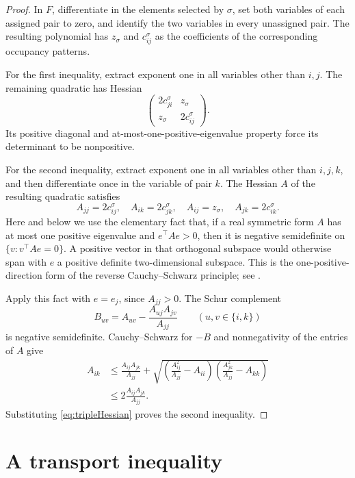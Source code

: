 \documentclass[11pt]{article}
\theoremstyle{definition}
\begin{document}
\begin{proof}
In $F$, differentiate in the elements selected by $\sigma$, set both variables
of each assigned pair to zero, and identify the two variables in every
unassigned pair.  The resulting polynomial has $z_{\sigma}$ and $c^{\sigma}_{ij}$ as
the coefficients of the corresponding occupancy patterns.

For the first inequality, extract exponent one in all variables other
than $i,j$.  The remaining quadratic has Hessian
\[
 \begin{pmatrix}2c^{\sigma}_{ji}&z_{\sigma}\\z_{\sigma}&2c^{\sigma}_{ij}\end{pmatrix}.
\]
Its positive diagonal and at-most-one-positive-eigenvalue property force
its determinant to be nonpositive.

For the second inequality, extract exponent one in all variables other
than $i,j,k$, and then differentiate once in the variable of pair $k$.
The Hessian $A$ of the resulting quadratic satisfies
\begin{equation}\label{eq:tripleHessian}
 A_{jj}=2c^{\sigma}_{ij},\quad A_{ik}=2c^{\sigma}_{jk},\quad
 A_{ij}=z_{\sigma},\quad A_{jk}=2c^{\sigma}_{ik}.
\end{equation}
Here and below we use the elementary fact that, if a real symmetric form
$A$ has at most one positive eigenvalue and $e^\top Ae>0$, then it is
negative semidefinite on $\{v:v^\top Ae=0\}$.  A positive vector in that
orthogonal subspace would otherwise span with $e$ a positive definite
two-dimensional subspace.
This is the one-positive-direction form of the reverse
Cauchy--Schwarz principle; see \cite[Lemma~3]{BrandenHuh2018}.

Apply this fact with $e=e_j$, since $A_{jj}>0$.  The Schur complement
\[
 B_{uv}=A_{uv}-\frac{A_{uj}A_{jv}}{A_{jj}}
 \qquad(u,v\in\{i,k\})
\]
is negative semidefinite.  Cauchy--Schwarz for $-B$ and nonnegativity of
the entries of $A$ give
\begin{align*}
 A_{ik}
 &\le\frac{A_{ij}A_{jk}}{A_{jj}}
   +\sqrt{\left(\frac{A_{ij}^2}{A_{jj}}-A_{ii}\right)
                \left(\frac{A_{jk}^2}{A_{jj}}-A_{kk}\right)}\\
 &\le 2\frac{A_{ij}A_{jk}}{A_{jj}}.
\end{align*}
Substituting \eqref{eq:tripleHessian} proves the second inequality.
\end{proof}

\section{A transport inequality}\label{sec:transport}
\end{document}
